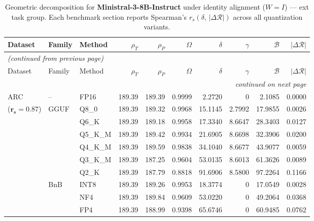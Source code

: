 \begingroup
\small
\setlength{\tabcolsep}{4pt}
\renewcommand{\arraystretch}{1.05}
\setlength{\LTcapwidth}{\textwidth}
\begin{longtable}{ll l rrrrrrr}
\caption{Geometric decomposition for \textbf{Ministral-3-8B-Instruct} under identity alignment ($W{=}I$) --- ext task group. Each benchmark section reports Spearman's $r_s(\delta,\,|\Delta\mathcal{R}|)$ across all quantization variants.}\label{tab:mistral_instruct_decomposition_ext}\\
\toprule
Dataset & Family & Method & $\rho_T$ & $\rho_P$ & $\Omega$ & $\delta$ & $\gamma$ & $\mathcal{B}$ & $|\Delta\mathcal{R}|$ \\
\midrule
\endfirsthead
\multicolumn{10}{l}{\small\itshape (continued from previous page)}\\
\toprule
Dataset & Family & Method & $\rho_T$ & $\rho_P$ & $\Omega$ & $\delta$ & $\gamma$ & $\mathcal{B}$ & $|\Delta\mathcal{R}|$ \\
\midrule
\endhead
\midrule
\multicolumn{10}{r}{\small\itshape continued on next page}\\
\endfoot
\bottomrule
\endlastfoot
ARC & -- & FP16 & 189.39 & 189.39 & 0.9999 & 2.2720 & \cellcolor{cyan!12} $0$ & 2.1085 & 0.0000 \\
{\small ($\mathbf{r_s{=}0.87}$)} & GGUF & Q8\_0 & 189.39 & 189.32 & 0.9968 & 15.1145 & 2.7992 & 17.9855 & 0.0026 \\
 &  & Q6\_K & 189.39 & 189.18 & 0.9958 & 17.3340 & 8.6647 & 28.3403 & 0.0127 \\
 &  & Q5\_K\_M & 189.39 & 189.42 & 0.9934 & 21.6905 & 8.6698 & 32.3906 & 0.0200 \\
 &  & Q4\_K\_M & 189.39 & 189.59 & 0.9838 & 34.1040 & 8.6677 & 43.9077 & 0.0059 \\
 &  & Q3\_K\_M & 189.39 & 187.25 & 0.9604 & 53.0135 & 8.6013 & 61.3626 & 0.0089 \\
 &  & Q2\_K & 189.39 & 187.79 & \cellcolor{red!18} 0.8818 & \cellcolor{red!18} 91.6906 & 8.5800 & \cellcolor{red!18} 97.2264 & \cellcolor{red!18} 0.1166 \\
 & BnB & INT8 & 189.39 & 189.26 & 0.9953 & 18.3774 & \cellcolor{cyan!12} $0$ & 17.0549 & 0.0028 \\
 &  & NF4 & 189.39 & 189.84 & 0.9609 & 53.0220 & \cellcolor{cyan!12} $0$ & 49.2064 & 0.0368 \\
 &  & FP4 & 189.39 & 188.99 & \cellcolor{red!18} 0.9398 & \cellcolor{red!18} 65.6746 & \cellcolor{cyan!12} $0$ & \cellcolor{red!18} 60.9485 & \cellcolor{red!18} 0.0762 \\

\end{longtable}

